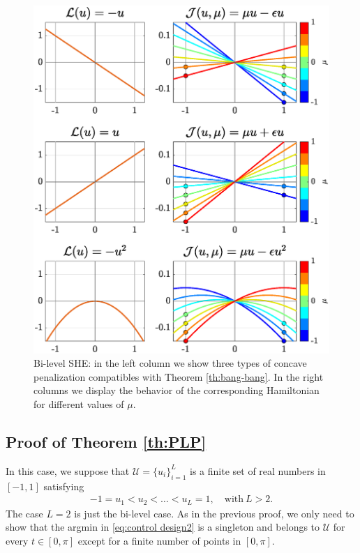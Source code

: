\documentclass[twocolumn]{autart}    %
\begin{document}
\begin{figure}[h] 
	\centering
	\includegraphics[scale=0.415]{img/fig03.eps}
	\caption{Bi-level SHE: in the left column we show three types of concave penalization compatibles with Theorem \ref{th:bang-bang}. In the right columns we display the behavior of the corresponding Hamiltonian for different values of $\mu$.}\label{fig:Bang-Bang-penalization} 
\end{figure}

\subsection{Proof of Theorem \ref{th:PLP}}\label{proof:PLP}

In this case, we suppose that $\mathcal{U} = \{ u_i\}_{i=1}^L$ is a finite set of real numbers in $[-1,1]$ satisfying
\begin{align*} 
	-1 = u_1 < u_2 <\ldots <u_L = 1, \quad \text{with} \ L> 2.
\end{align*} 
The case $L=2$ is just the bi-level case. As in the previous proof, we only need to show that the argmin in \eqref{eq:control design2} is a singleton and belongs to $\mathcal{U}$ for every $t\in [0,\pi]$ except for a finite number of points in $[0,\pi]$.
\end{document}
